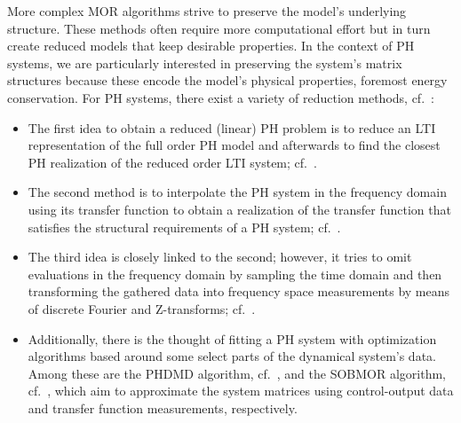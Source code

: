 More complex MOR algorithms strive to preserve the model's underlying structure.
These methods often require more computational effort but in turn create reduced models that keep desirable properties.
In the context of \ac{PH} systems, we are particularly interested in preserving the system's matrix structures because these encode the model's physical properties, foremost energy conservation.
For \ac{PH} systems, there exist a variety of reduction methods, cf.~\cite{Polyuga2010}:
\begin{itemize}
    \item The first idea to obtain a reduced (linear) \ac{PH} problem is to reduce an \ac{LTI} representation of the full order \ac{PH} model and afterwards to find the closest \ac{PH} realization of the reduced order \ac{LTI} system; cf.~\cite{Gillis2018, Cherifi2019}.
    \item The second method is to interpolate the \ac{PH} system in the frequency domain using its transfer function to obtain a realization of the transfer function that satisfies the structural requirements of a \ac{PH} system; cf.~\cite{BGD2020, Schwerdtner2021, Poussot2022}.
    \item The third idea is closely linked to the second; however, it tries to omit evaluations in the frequency domain by sampling the time domain and then transforming the gathered data into frequency space measurements by means of discrete Fourier and Z-transforms; cf.~\cite{Najnudel2021, Cherifi2022, Günther2023}.
    \item Additionally, there is the thought of fitting a \ac{PH} system with optimization algorithms based around some select parts of the dynamical system's data.
        Among these are the \ac{PHDMD} algorithm, cf.~\cite{Morandin2023}, and the SOBMOR algorithm, cf.~\cite{SV2023}, which aim to approximate the system matrices using control-output data and transfer function measurements, respectively.
\end{itemize}

